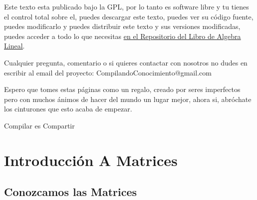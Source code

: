 \documentclass[12pt, fleqn]{report}                             %
\theoremstyle{break}                                            %
\begin{document}
    Este texto esta publicado bajo la GPL, por lo tanto es software libre y tu tienes el control total sobre
    el, puedes descargar este texto, puedes ver su código fuente, puedes modificarlo y puedes distribuir este
    texto y sus versiones modificadas, puedes acceder a todo lo que necesitas 
    \href{http://www.github.com/CompilandoConocimiento/LibroAlgebraLineal}
    {\underline{en el Repositorio del Libro de Algebra Lineal}}. 

    Cualquier pregunta, comentario o si quieres contactar con nosotros no dudes en escribir al email del proyecto:
    CompilandoConocimiento@gmail.com

    Espero que tomes estas páginas como un regalo, creado por seres imperfectos pero con muchos ánimos de hacer
    del mundo un lugar mejor, ahora si, abróchate los cinturones que esto acaba de empezar.

    \begin{flushright}
        Compilar es Compartir
    \end{flushright}







\part{Introducción A Matrices}
\clearpage




    \chapter{Conozcamos las Matrices}



        \clearpage
\end{document}

